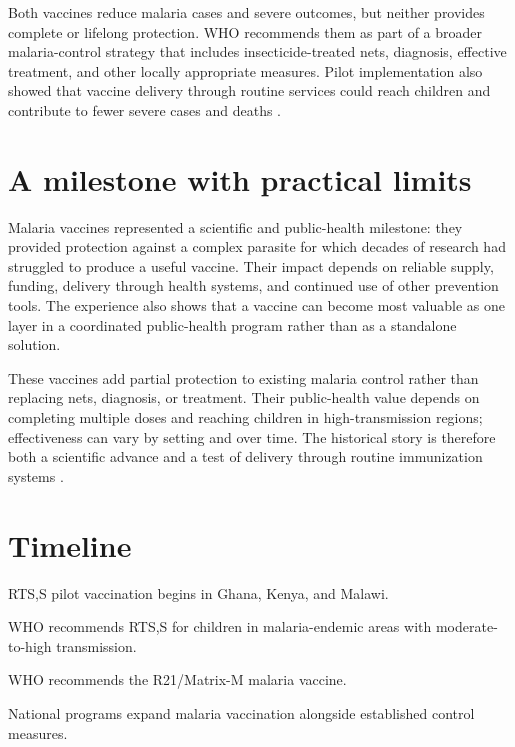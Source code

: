 \documentclass[12pt,oneside]{book}
\begin{document}
Both vaccines reduce malaria cases and severe outcomes, but neither provides
complete or lifelong protection. WHO recommends them as part of a broader
malaria-control strategy that includes insecticide-treated nets, diagnosis,
effective treatment, and other locally appropriate measures. Pilot
implementation also showed that vaccine delivery through routine services
could reach children and contribute to fewer severe cases and deaths
\cite{whoMalariaVaccineUpdate}.

\section{A milestone with practical limits}
Malaria vaccines represented a scientific and public-health milestone: they
provided protection against a complex parasite for which decades of research
had struggled to produce a useful vaccine. Their impact depends on reliable
supply, funding, delivery through health systems, and continued use of other
prevention tools. The experience also shows that a vaccine can become most
valuable as one layer in a coordinated public-health program rather than as a
standalone solution.

These vaccines add partial protection to existing malaria control rather than
replacing nets, diagnosis, or treatment. Their public-health value depends on
completing multiple doses and reaching children in high-transmission regions;
effectiveness can vary by setting and over time. The historical story is
therefore both a scientific advance and a test of delivery through routine
immunization systems \cite{whoMalariaVaccinePaper,whoMalariaVaccineUpdate}.

\section*{Timeline}
\begin{description}[leftmargin=2.3cm,style=nextline]
  \item[2019] RTS,S pilot vaccination begins in Ghana, Kenya, and Malawi.
  \item[2021] WHO recommends RTS,S for children in malaria-endemic areas with moderate-to-high transmission.
  \item[2023] WHO recommends the R21/Matrix-M malaria vaccine.
  \item[2024 onward] National programs expand malaria vaccination alongside established control measures.
\end{description}
\end{document}
